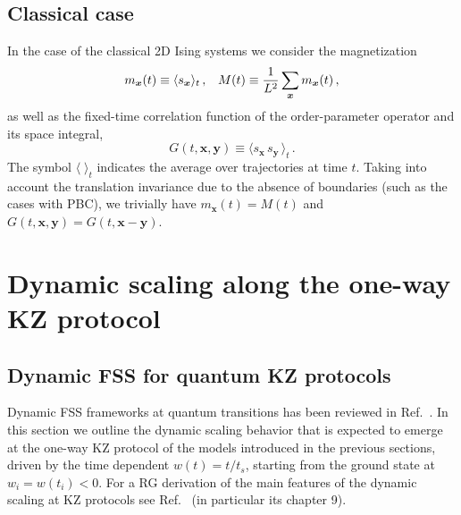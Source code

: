 \subsection{Classical case}
\label{clobs}

In the case of the classical 2D Ising systems we consider
the magnetization
  \begin{equation}
    m_{\bm x}(t) \equiv \langle s_{\bm x} \rangle_t\,,
      \;\;\; M(t) \equiv {1\over L^2} \sum_{\bm x} m_{\bm x}(t)\,,
  \label{magnt2d}
\end{equation}
as well as the fixed-time correlation function of the order-parameter
operator and its space integral,
\begin{equation}
  G(t,{\bm x},{\bm y}) \equiv \langle s_{\bm x}\, s_{\bm y}\,
  \rangle_t \,.
  \label{twopointtcl}
\end{equation}
The symbol $\langle \; \rangle_t$ indicates the average over
trajectories at time $t$.  Taking into account the translation
invariance due to the absence of boundaries (such as the cases with
PBC), we trivially have $m_{\bm x}(t) = M(t)$ and $G(t,{\bm x},{\bm
  y}) = G(t,{\bm x}-{\bm y})$.




\section{Dynamic scaling along the one-way KZ protocol}
\label{fssKZoneway}

\subsection{Dynamic FSS for quantum KZ protocols}
\label{qfssoneway}

Dynamic FSS frameworks at quantum transitions has been reviewed in
Ref.~\cite{rossini2021coherent}.  In this section we outline the dynamic scaling
behavior that is expected to emerge at the one-way KZ protocol of the
models introduced in the previous sections, driven by the time
dependent $w(t)=t/t_s$, starting from the ground state at
$w_i=w(t_i)<0$. For a RG derivation of the main features of the
dynamic scaling at KZ protocols see Ref.~\cite{rossini2021coherent} (in particular
its chapter 9).

